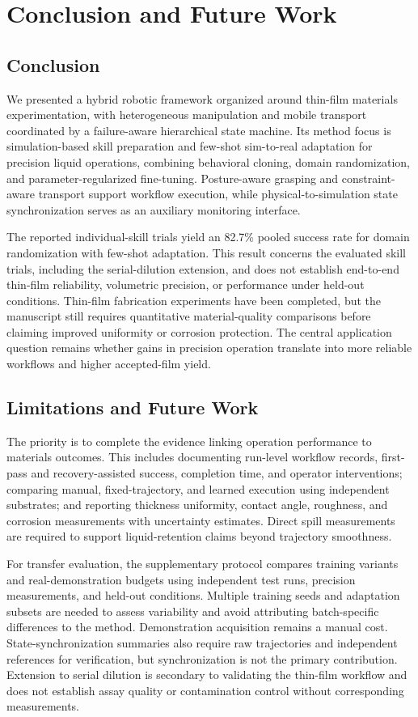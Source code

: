 \section{Conclusion and Future Work}
\label{sec:conclusion}

\subsection{Conclusion}
\label{subsec:conclusion_summary}
We presented a hybrid robotic framework organized around thin-film materials experimentation, with heterogeneous manipulation and mobile transport coordinated by a failure-aware hierarchical state machine. Its method focus is simulation-based skill preparation and few-shot sim-to-real adaptation for precision liquid operations, combining behavioral cloning, domain randomization, and parameter-regularized fine-tuning. Posture-aware grasping and constraint-aware transport support workflow execution, while physical-to-simulation state synchronization serves as an auxiliary monitoring interface.

The reported individual-skill trials yield an 82.7\% pooled success rate for domain randomization with few-shot adaptation. This result concerns the evaluated skill trials, including the serial-dilution extension, and does not establish end-to-end thin-film reliability, volumetric precision, or performance under held-out conditions. Thin-film fabrication experiments have been completed, but the manuscript still requires quantitative material-quality comparisons before claiming improved uniformity or corrosion protection. The central application question remains whether gains in precision operation translate into more reliable workflows and higher accepted-film yield.

\subsection{Limitations and Future Work}
\label{subsec:limitations_future}
The priority is to complete the evidence linking operation performance to materials outcomes. This includes documenting run-level workflow records, first-pass and recovery-assisted success, completion time, and operator interventions; comparing manual, fixed-trajectory, and learned execution using independent substrates; and reporting thickness uniformity, contact angle, roughness, and corrosion measurements with uncertainty estimates. Direct spill measurements are required to support liquid-retention claims beyond trajectory smoothness.

For transfer evaluation, the supplementary protocol compares training variants and real-demonstration budgets using independent test runs, precision measurements, and held-out conditions. Multiple training seeds and adaptation subsets are needed to assess variability and avoid attributing batch-specific differences to the method. Demonstration acquisition remains a manual cost. State-synchronization summaries also require raw trajectories and independent references for verification, but synchronization is not the primary contribution. Extension to serial dilution is secondary to validating the thin-film workflow and does not establish assay quality or contamination control without corresponding measurements.
